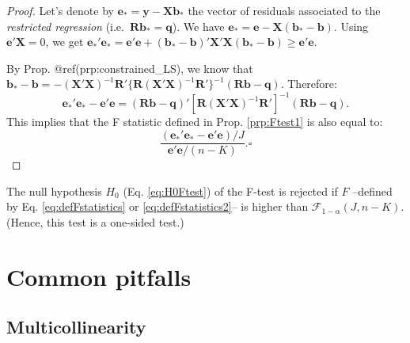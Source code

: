 \documentclass[
]{book}
\theoremstyle{definition}
\theoremstyle{definition}
\theoremstyle{definition}
\theoremstyle{definition}
\theoremstyle{remark}
\begin{document}
\begin{proof}
Let's denote by \(\mathbf{e}_*=\mathbf{y}-\mathbf{X}\mathbf{b}_*\) the vector of residuals associated to the \emph{restricted regression} (i.e.~\(\mathbf{R}\mathbf{b}_*=\mathbf{q}\)).
We have \(\mathbf{e}_*=\mathbf{e} - \mathbf{X}(\mathbf{b}_*-\mathbf{b})\). Using \(\mathbf{e}'\mathbf{X}=0\), we get \(\mathbf{e}_*'\mathbf{e}_*=\mathbf{e}'\mathbf{e} + (\mathbf{b}_*-\mathbf{b})'\mathbf{X}'\mathbf{X}(\mathbf{b}_*-\mathbf{b}) \ge \mathbf{e}'\mathbf{e}\).

By Prop. @ref(prp:constrained\_LS), we know that \(\mathbf{b}_*-\mathbf{b}=-(\mathbf{X}'\mathbf{X})^{-1} \mathbf{R}'\{\mathbf{R}(\mathbf{X}'\mathbf{X})^{-1}\mathbf{R}'\}^{-1}(\mathbf{R}\mathbf{b} - \mathbf{q})\). Therefore:
\[
\mathbf{e}_*'\mathbf{e}_* - \mathbf{e}'\mathbf{e} = (\mathbf{R}\mathbf{b} - \mathbf{q})'[\mathbf{R}(\mathbf{X}'\mathbf{X})^{-1}\mathbf{R}']^{-1}(\mathbf{R}\mathbf{b} - \mathbf{q}).
\]
This implies that the F statistic defined in Prop. \ref{prp:Ftest1} is also equal to:
\[
\frac{(\mathbf{e}_*'\mathbf{e}_* - \mathbf{e}'\mathbf{e})/J}{\mathbf{e}'\mathbf{e}/(n-K)}. \square
\]
\end{proof}

The null hypothesis \(H_0\) (Eq. \eqref{eq:H0Ftest}) of the F-test is rejected if \(F\) --defined by Eq. \eqref{eq:defFstatistics} or \eqref{eq:defFstatistics2}-- is higher than \(\mathcal{F}_{1-\alpha}(J,n-K)\). (Hence, this test is a one-sided test.)

\hypertarget{common-pitfalls}{%
\section{Common pitfalls}\label{common-pitfalls}}

\hypertarget{multicollinearity}{%
\subsection{Multicollinearity}\label{multicollinearity}}
\end{document}
